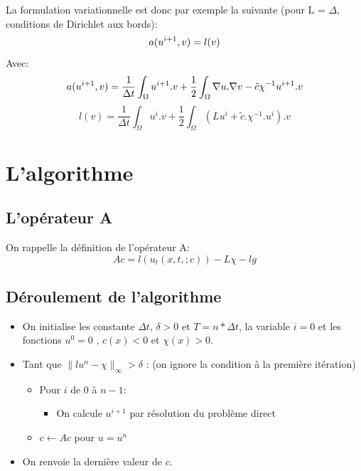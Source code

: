 \documentclass[a4paper]{article}
\begin{document}
	La formulation variationnelle est donc par exemple la suivante (pour L = $\Delta$, conditions de Dirichlet aux bords):\\
	\begin{equation}
		a(u^{i+1},v)=l(v)\\
	\end{equation}
	Avec:\\
	\begin{equation}
		a(u^{i+1},v) = \frac{1}{\Delta t} \int_{\Omega}u^{i+1}.v + \frac{1}{2} \int_{\Omega}\nabla u. \nabla v - \tilde{c}\chi^{-1}u^{i+1}.v\\
	\end{equation}
	\begin{equation}
		l(v) = \frac{1}{\Delta t} \int_{\Omega}u^{i}.v + \frac{1}{2} \int_{\Omega}(Lu^{i} + \tilde{c}.\chi^{-1}.u^{i}).v
	\end{equation}
	
	\section{L'algorithme}
	
	\subsection{L'opérateur A}
	
	On rappelle la définition de l'opérateur A:
	\begin{equation}
		Ac = l(u_{t}(x,t,;c)) - L\chi - lg
	\end{equation}
	
	\subsection{Déroulement de l'algorithme}
	\begin{itemize}
		\item On initialise les constante $\Delta t$, $\delta>0$ et $T = n*\Delta t$, la variable $i=0$ et les fonctions $u^{0}=0$ , $c(x) < 0$ et $\chi(x)>0$.
		\item Tant que $\parallel lu^{n}-\chi \parallel_{\infty} > \delta$ : (on ignore la condition à la première itération)
		\begin{itemize}
			\item Pour $i$ de $0$ à $n-1$:
			\begin{itemize}
				\item On calcule $u^{i+1}$ par résolution du problème direct
			\end{itemize}
			\item $c \gets Ac$ pour $u=u^{n} $
		\end{itemize}
		\item On renvoie la dernière valeur de $c$.
	\end{itemize}
\end{document}
